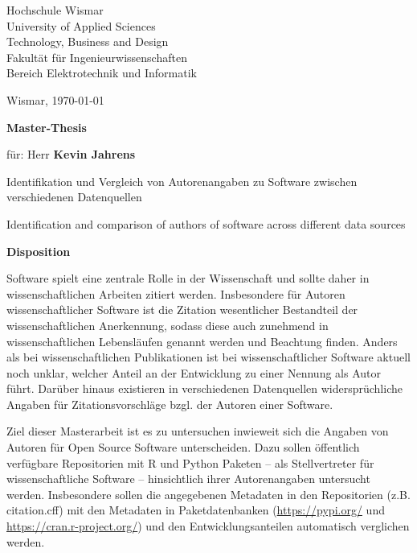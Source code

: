 \documentclass[a4paper,DIV=12]{scrartcl}
\begin{document}
\thispagestyle{empty}

\vspace*{.2cm}

\begin{minipage}{.7\textwidth}
Hochschule Wismar\\
University of Applied Sciences\\
Technology, Business and Design\\
Fakultät für Ingenieurwissenschaften\\
Bereich Elektrotechnik und Informatik\\
\end{minipage}\hfill
\begin{minipage}{.3\textwidth}
    Wismar, \today{}
    
    \vfill{}
\end{minipage}


{\Large\centerline{\textbf{Master-Thesis}}}

\vspace*{1em}

für: Herr \textbf{Kevin Jahrens}

\vspace*{1em}

Identifikation und Vergleich von Autorenangaben zu Software zwischen verschiedenen Datenquellen

\noindent\makebox[\linewidth]{\rule{\linewidth}{0.4pt}}
Identification and comparison of authors of software across different data sources

\noindent\makebox[\linewidth]{\rule{\linewidth}{0.4pt}}

\textbf{Disposition}
\vspace*{.1cm}

Software spielt eine zentrale Rolle in der Wissenschaft und sollte daher in wissenschaftlichen Arbeiten zitiert werden.
Insbesondere für Autoren wissenschaftlicher Software ist die Zitation wesentlicher Bestandteil der wissenschaftlichen Anerkennung, sodass diese auch zunehmend in wissenschaftlichen Lebensläufen genannt werden und Beachtung finden.
Anders als bei wissenschaftlichen Publikationen ist bei wissenschaftlicher Software aktuell noch unklar, welcher Anteil an der Entwicklung zu einer Nennung als Autor führt.
Darüber hinaus existieren in verschiedenen Datenquellen widersprüchliche Angaben für Zitationsvorschläge bzgl. der Autoren einer Software.

Ziel dieser Masterarbeit ist es zu untersuchen inwieweit sich die Angaben von Autoren für Open Source Software unterscheiden. 
Dazu sollen öffentlich verfügbare Repositorien mit R und Python Paketen -- als Stellvertreter für wissenschaftliche Software -- hinsichtlich ihrer Autorenangaben untersucht werden.
Insbesondere sollen die angegebenen Metadaten in den Repositorien (z.B. citation.cff) mit den Metadaten in Paketdatenbanken (\url{https://pypi.org/} und \url{https://cran.r-project.org/}) und den Entwicklungsanteilen automatisch verglichen werden.
\end{document}
